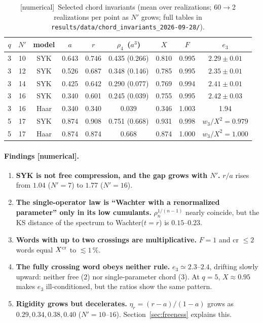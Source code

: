 \documentclass[11pt]{article}
\newcommand{\Np}{N'}
\newcommand{\tagbox}[2]{\textsf{\small\color{#1}[#2]}}
\newcommand{\NUM}{\tagbox{cnum}{numerical}}
\theoremstyle{remark}
\begin{document}
\begin{table}[h]
\centering\small
\begin{tabular}{@{}cc c c c c c c c@{}}
\toprule
$q$ & $\Np$ & model & $a$ & $r$ & $\rho_4$ \,($a^3$) & $X$ & $F$ & $e_3$\\
\midrule
3 & 10 & SYK & 0.643 & 0.746 & 0.435 (0.266) & 0.810 & 0.995 & $2.29\pm0.01$\\
3 & 12 & SYK & 0.526 & 0.687 & 0.348 (0.146) & 0.785 & 0.995 & $2.35\pm0.01$\\
3 & 14 & SYK & 0.425 & 0.642 & 0.290 (0.077) & 0.769 & 0.994 & $2.41\pm0.01$\\
3 & 16 & SYK & 0.340 & 0.601 & 0.245 (0.039) & 0.755 & 0.995 & $2.42\pm0.03$\\
3 & 16 & Haar & 0.340 & 0.340 & 0.039 & 0.346 & 1.003 & 1.94\\
5 & 17 & SYK & 0.874 & 0.908 & 0.751 (0.668) & 0.931 & 0.998 & $w_3/X^2=0.979$\\
5 & 17 & Haar & 0.874 & 0.874 & 0.668 & 0.874 & 1.000 & $w_3/X^2=1.000$\\
\bottomrule
\end{tabular}
\caption{\NUM\ Selected chord invariants (mean over realizations; 60$\to$2 realizations per point as $\Np$ grows;
full tables in \texttt{results/data/chord\_invariants\_2026-09-28/}).}
\label{tab:campaign}
\end{table}

\paragraph{Findings \NUM.}
\begin{enumerate}\itemsep1pt
\item \textbf{SYK is not free compression, and the gap grows with $\Np$.} $r/a$ rises from $1.04$ ($\Np=7$) to
  $1.77$ ($\Np=16$).
\item \textbf{The single-operator law is ``Wachter with a renormalized parameter'' only in its low cumulants.}
  $\rho_n^{1/(n-1)}$ nearly coincide, but the KS distance of the spectrum to Wachter($t=r$) is $0.15$--$0.23$.
\item \textbf{Words with up to two crossings are multiplicative.} $F=1$ and cr $\le2$ words equal $X^{\rm cr}$ to
  $\lesssim1\,\%$.
\item \textbf{The fully crossing word obeys neither rule.} $e_3\simeq2.3$--$2.4$, drifting slowly upward:
  neither free ($2$) nor single-parameter chord ($3$). At $q=5$, $X\approx0.95$ makes $e_3$ ill-conditioned, but
  the ratios show the same pattern.
\item \textbf{Rigidity grows but decelerates.} $\eta_r=(r-a)/(1-a)$ grows as $0.29,0.34,0.38,0.40$ ($\Np=10$--$16$).
  Section~\ref{sec:freeness} explains this.
\end{enumerate}
\end{document}
